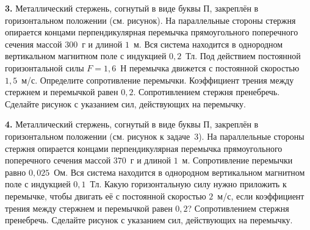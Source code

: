 \documentclass[12pt,a4paper]{article}
\begin{document}
\begin{taskadvanced}
\textbf{3.} Металлический стержень, согнутый в виде буквы П, закреплён в горизонтальном положении
(см. рисунок). На параллельные стороны стержня опирается концами перпендикулярная перемычка
прямоугольного поперечного сечения массой $300$~г и длиной $1$~м. Вся система находится в однородном
вертикальном магнитном поле с индукцией $0{,}2$~Тл. Под действием постоянной горизонтальной силы
$F=1{,}6$~Н перемычка движется с постоянной скоростью $1{,}5$~м/с. Определите сопротивление
перемычки. Коэффициент трения между стержнем и перемычкой равен $0{,}2$. Сопротивлением стержня
пренебречь. Сделайте рисунок с указанием сил, действующих на перемычку.

\nopagebreak\smallskip
\begin{center}
\end{center}
\end{taskadvanced}

\begin{taskadvanced}
\textbf{4.} Металлический стержень, согнутый в виде буквы П, закреплён в горизонтальном положении
(см. рисунок к задаче~3). На параллельные стороны стержня опирается концами перпендикулярная
перемычка прямоугольного поперечного сечения массой $370$~г и длиной $1$~м. Сопротивление перемычки
равно $0{,}025$~Ом. Вся система находится в однородном вертикальном магнитном поле с индукцией
$0{,}1$~Тл. Какую горизонтальную силу нужно приложить к перемычке, чтобы двигать её с постоянной
скоростью $2$~м/с, если коэффициент трения между стержнем и перемычкой равен $0{,}2$? Сопротивлением
стержня пренебречь. Сделайте рисунок с указанием сил, действующих на перемычку.
\end{taskadvanced}
\end{document}
